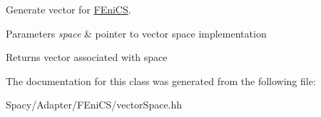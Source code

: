 Generate vector for \hyperlink{namespaceSpacy_1_1FEniCS}{F\+Eni\+C\+S}. 


\begin{DoxyParams}{Parameters}
{\em space} & pointer to vector space implementation \\
\hline
\end{DoxyParams}
\begin{DoxyReturn}{Returns}
vector associated with space 
\end{DoxyReturn}


The documentation for this class was generated from the following file\+:\begin{DoxyCompactItemize}
\item 
Spacy/\+Adapter/\+F\+Eni\+C\+S/vector\+Space.\+hh\end{DoxyCompactItemize}
